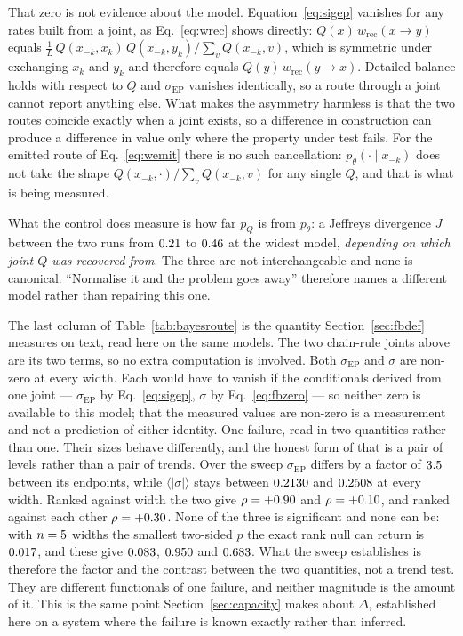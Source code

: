 \documentclass[11pt]{article}
\newcommand{\sigEP}{\sigma_{\mathrm{EP}}}
\begin{document}
That zero is not evidence about the model.  Equation~\eqref{eq:sigep}
vanishes for any rates built from a joint, as Eq.~\eqref{eq:wrec} shows
directly: $Q(x)\,w_{\mathrm{rec}}(x \to y)$ equals
$\tfrac{1}{L}\,Q(x_{-k}, x_k)\,Q(x_{-k}, y_k) / \sum_{v} Q(x_{-k}, v)$,
which is symmetric under exchanging $x_k$ and $y_k$ and therefore equals
$Q(y)\,w_{\mathrm{rec}}(y \to x)$.  Detailed balance holds with respect to
$Q$ and $\sigEP$ vanishes identically, so a route through a joint cannot
report anything else.  What makes the asymmetry harmless is that the two
routes coincide exactly when a joint exists, so a difference in construction
can produce a difference in value only where the property under test fails.
For the emitted route of Eq.~\eqref{eq:wemit} there is no such
cancellation: $p_\theta(\cdot \mid x_{-k})$ does not take the shape $Q(x_{-k}, \cdot) / \sum_{v} Q(x_{-k}, v)$
for any single $Q$, and that is what is being measured.

What the control does measure is how far $p_Q$ is from $p_\theta$: a
Jeffreys divergence $J$ between the two runs from $0.21$ to
$0.46$ at the widest model, \emph{depending on which joint $Q$
was recovered from}.  The
three are not interchangeable and none is canonical.  ``Normalise it and the
problem goes away'' therefore names a different model rather than repairing
this one.

The last column of Table~\ref{tab:bayesroute} is the quantity
Section~\ref{sec:fbdef} measures on text, read here on the same models.  The
two chain-rule joints above are its two terms, so no extra computation is
involved.  Both $\sigEP$ and $\sigma$ are non-zero at every width.  Each would have to
vanish if the conditionals derived from one joint --- $\sigEP$ by
Eq.~\eqref{eq:sigep}, $\sigma$ by Eq.~\eqref{eq:fbzero} --- so neither zero
is available to this model; that the measured values are non-zero is a
measurement and not a prediction of either identity.  One failure, read in
two quantities rather than one.  Their sizes behave differently, and the honest form of that is a pair of
levels rather than a pair of trends.  Over the sweep $\sigEP$ differs by a
factor of $3.5$ between its endpoints, while
$\langle|\sigma|\rangle$ stays between $0.2130$ and
$0.2508$ at every width.  Ranked against width the two give $\rho =
+0.90$ and $\rho = +0.10$, and ranked against each other $\rho =
+0.30$.
None of the three is significant and none can be: with $n =
5$ widths the smallest two-sided $p$ the exact rank null
can return is $0.017$, and these give $0.083$, $0.950$ and
$0.683$.  What the sweep establishes is therefore the factor and the
contrast between the two quantities, not a trend test.  They are different
functionals of one failure, and neither magnitude is the amount of it.  This is the same point Section~\ref{sec:capacity}
makes about $\Delta$, established here on a system where the failure is
known exactly rather than inferred.
\end{document}
